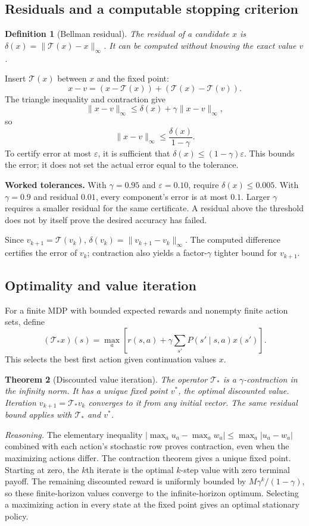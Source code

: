 \documentclass[11pt]{article}
\newtheorem{definition}{Definition}[section]
\newtheorem{theorem}[definition]{Theorem}
\theoremstyle{remark}\newtheorem{remark}[definition]{Remark}
\begin{document}
\clearpage
\subsection{Residuals and a computable stopping criterion}
\begin{definition}[Bellman residual]
The residual of a candidate $x$ is $\delta(x)=\|\mathcal T(x)-x\|_\infty$. It can be computed without knowing the exact value $v$.
\end{definition}
Insert $\mathcal T(x)$ between $x$ and the fixed point:
\[
x-v=(x-\mathcal T(x))+(\mathcal T(x)-\mathcal T(v)).
\]
The triangle inequality and contraction give
\[
\|x-v\|_\infty\leq\delta(x)+\gamma\|x-v\|_\infty,
\]
so
\[
\boxed{\|x-v\|_\infty\leq\frac{\delta(x)}{1-\gamma}.}
\]
To certify error at most $\varepsilon$, it is sufficient that $\delta(x)\leq(1-\gamma)\varepsilon$. This bounds the error; it does not set the actual error equal to the tolerance.

\textbf{Worked tolerances.} With $\gamma=0.95$ and $\varepsilon=0.10$, require $\delta(x)\leq0.005$. With $\gamma=0.9$ and residual $0.01$, every component's error is at most $0.1$. Larger $\gamma$ requires a smaller residual for the same certificate. A residual above the threshold does not by itself prove the desired accuracy has failed.

Since $v_{k+1}=\mathcal T(v_k)$, $\delta(v_k)=\|v_{k+1}-v_k\|_\infty$. The computed difference certifies the error of $v_k$; contraction also yields a factor-$\gamma$ tighter bound for $v_{k+1}$.

\subsection{Optimality and value iteration}
For a finite MDP with bounded expected rewards and nonempty finite action sets, define
\[
(\mathcal T_*x)(s)=\max_a\left[r(s,a)+\gamma\sum_{s'}P(s'\mid s,a)x(s')\right].
\]
This selects the best first action given continuation values $x$.
\begin{theorem}[Discounted value iteration]
The operator $\mathcal T_*$ is a $\gamma$-contraction in the infinity norm. It has a unique fixed point $v^*$, the optimal discounted value. Iteration $v_{k+1}=\mathcal T_*v_k$ converges to it from any initial vector. The same residual bound applies with $\mathcal T_*$ and $v^*$.
\end{theorem}
\textit{Reasoning.} The elementary inequality
$|\max_a u_a-\max_a w_a|\leq\max_a|u_a-w_a|$
combined with each action's stochastic row proves contraction, even when the maximizing actions differ. The contraction theorem gives a unique fixed point. Starting at zero, the $k$th iterate is the optimal $k$-step value with zero terminal payoff. The remaining discounted reward is uniformly bounded by $M\gamma^k/(1-\gamma)$, so these finite-horizon values converge to the infinite-horizon optimum. Selecting a maximizing action in every state at the fixed point gives an optimal stationary policy.
\end{document}

